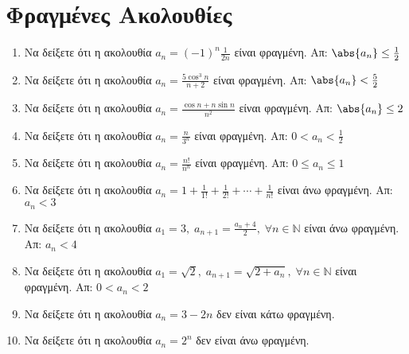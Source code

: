 


\everymath{\displaystyle}
\pagestyle{askhseis}



\begin{center}
  \minibox[c]{\large \bfseries \textcolor{Col1}{Ακολουθίες}\\ \large 
  \textcolor{Col1}{Ασκήσεις}}
\end{center}

\vspace{\baselineskip}


\setcounter{chapter}{1}
\section{Φραγμένες Ακολουθίες}

\begin{enumerate}
  \item Να δείξετε ότι η ακολουθία $ a_{n} = (-1)^{n}\frac{1}{2n} $ είναι 
    φραγμένη.
    \hfill Απ: $ \abs{a_{n}} \leq \frac{1}{2} $ 
  \item Να δείξετε ότι η ακολουθία $ a_{n} = \frac{5 \cos^{3}{n}}{n+2} $ 
    είναι φραγμένη.
    \hfill Απ: $ \abs{a_{n}} < \frac{5}{2}  $ 
  \item Να δείξετε ότι η ακολουθία $ a_{n} = \frac{\cos{n} + n \sin{n}}{n^{2}} $ 
    είναι φραγμένη. 
    \hfill Απ: $ \abs{a_{n}} \leq 2 $ 
  \item Να δείξετε ότι η ακολουθία $ a_{n} = \frac{n}{3^{n}} $ είναι 
    φραγμένη. 
    \hfill Απ: $ 0<a_{n}< \frac{1}{2} $
  \item Να δείξετε ότι η ακολουθία $ a_{n} = \frac{n!}{n^{n}} $ είναι 
    φραγμένη. 
    \hfill Απ: $ 0 \leq a_{n} \leq 1 $ 
  \item Να δείξετε ότι η ακολουθία $ a_{n} = 1 + \frac{1}{1!} +
    \frac{1}{2!} + \cdots + \frac{1}{n!} $ είναι άνω φραγμένη.
    \hfill Απ: $ a_{n} < 3 $ 
  \item Να δείξετε ότι η ακολουθία $ a_{1} = 3, \; a_{n+1} =
    \frac{a_{n}+4}{2}, \; \forall n \in \mathbb{N} $ είναι άνω φραγμένη.
    \hfill Απ: $ a_{n} < 4 $ 
  \item Να δείξετε ότι η ακολουθία $ a_{1} = \sqrt{2}, \; a_{n+1} =
    \sqrt{2+ a_{n}}, \; \forall n \in \mathbb{N} $ είναι φραγμένη.
    \hfill Απ: $ 0 < a_{n} < 2$ 
  \item Να δείξετε ότι η ακολουθία $ a_{n} = 3-2n $ δεν είναι κάτω φραγμένη. 
  \item Να δείξετε ότι η ακολουθία $ a_{n} = 2^{n} $ δεν είναι άνω 
    φραγμένη.
\end{enumerate}

